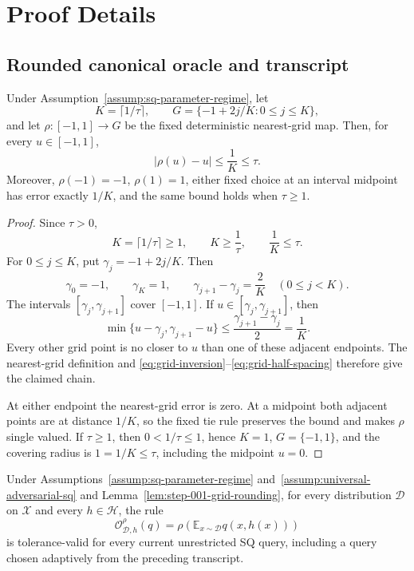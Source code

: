 \appendix

\section{Proof Details}\label{sec:proof-details}

\subsection{Rounded canonical oracle and transcript}\label{app:step-001}

\begin{lemma}\label{lem:step-001-grid-rounding}
Under Assumption~\ref{assump:sq-parameter-regime}, let
\[
K=\lceil 1/\tau\rceil,
\qquad
G=\{-1+2j/K:0\le j\le K\},
\]
and let \(\rho:[-1,1]\to G\) be the fixed deterministic nearest-grid
map.  Then, for every \(u\in[-1,1]\),
\[
|\rho(u)-u|\le \frac1K\le\tau.
\]
Moreover, \(\rho(-1)=-1\), \(\rho(1)=1\), either fixed choice at an
interval midpoint has error exactly \(1/K\), and the same bound holds when
\(\tau\ge 1\).
\end{lemma}

\begin{proof}
Since \(\tau>0\),
\[
K=\lceil 1/\tau\rceil\ge 1,
\qquad
K\ge \frac1\tau,
\qquad
\frac1K\le\tau.
\tag{A.1}\label{eq:grid-inversion}
\]
For \(0\le j\le K\), put \(\gamma_j=-1+2j/K\).  Then
\[
\gamma_0=-1,
\qquad
\gamma_K=1,
\qquad
\gamma_{j+1}-\gamma_j=\frac2K
\quad(0\le j<K).
\tag{A.2}\label{eq:grid-spacing}
\]
The intervals \([\gamma_j,\gamma_{j+1}]\) cover \([-1,1]\).  If
\(u\in[\gamma_j,\gamma_{j+1}]\), then
\[
\min\{u-\gamma_j,\gamma_{j+1}-u\}
\le \frac{\gamma_{j+1}-\gamma_j}{2}
=\frac1K.
\tag{A.3}\label{eq:grid-half-spacing}
\]
Every other grid point is no closer to \(u\) than one of these adjacent
endpoints.  The nearest-grid definition and
\eqref{eq:grid-inversion}--\eqref{eq:grid-half-spacing} therefore give the
claimed chain.

At either endpoint the nearest-grid error is zero.  At a midpoint both
adjacent points are at distance \(1/K\), so the fixed tie rule preserves the
bound and makes \(\rho\) single valued.  If \(\tau\ge1\), then
\(0<1/\tau\le1\), hence \(K=1\), \(G=\{-1,1\}\), and the covering radius
is \(1=1/K\le\tau\), including the midpoint \(u=0\).
\end{proof}

\begin{proposition}
\label{prop:step-001-canonical-oracle}
Under Assumptions~\ref{assump:sq-parameter-regime}
and~\ref{assump:universal-adversarial-sq} and
Lemma~\ref{lem:step-001-grid-rounding}, for every distribution
\(\mathcal D\) on \(\mathcal X\) and every \(h\in\mathcal H\), the rule
\[
\mathcal O^\rho_{\mathcal D,h}(q)
=\rho\!\left(\mathbb E_{x\sim\mathcal D}q(x,h(x))\right)
\]
is tolerance-valid for every current unrestricted SQ query, including a
query chosen adaptively from the preceding transcript.
\end{proposition}

